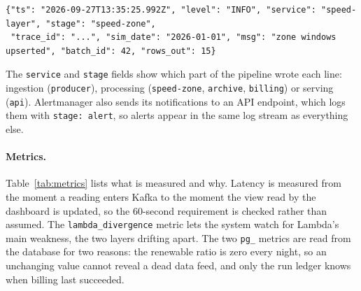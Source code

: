 \documentclass[11pt,a4paper]{article}
\begin{document}
\begin{lstlisting}[caption={A speed-layer log line.},label={lst:log}]
{"ts": "2026-09-27T13:35:25.992Z", "level": "INFO", "service": "speed-layer", "stage": "speed-zone",
 "trace_id": "...", "sim_date": "2026-01-01", "msg": "zone windows upserted", "batch_id": 42, "rows_out": 15}
\end{lstlisting}

The \texttt{service} and \texttt{stage} fields show which part of the pipeline wrote each
line: ingestion (\texttt{producer}), processing (\texttt{speed-zone}, \texttt{archive},
\texttt{billing}) or serving (\texttt{api}). Alertmanager also sends its notifications to an
API endpoint, which logs them with \texttt{stage: alert}, so alerts appear in the same log
stream as everything else.

\paragraph{Metrics.} Table~\ref{tab:metrics} lists what is measured and why. Latency is
measured from the moment a reading enters Kafka to the moment the view read by the dashboard
is updated, so the 60-second requirement is checked rather than assumed. The
\texttt{lambda\_divergence} metric lets the system watch for Lambda's main weakness, the two
layers drifting apart. The two \texttt{pg\_} metrics are read from the database for two
reasons: the renewable ratio is zero every night, so an unchanging value cannot reveal a dead
data feed, and only the run ledger knows when billing last succeeded.
\end{document}
